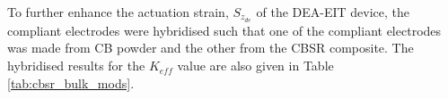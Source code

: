 To further enhance the actuation strain, $S_{z_{de}}$ of the DEA-EIT device, the compliant electrodes were hybridised such that one of the compliant electrodes was made from CB powder and the other from the CBSR composite. The hybridised results for the $K_{e\!f\!f}$ value are also given in Table \ref{tab:cbsr_bulk_mods}.



